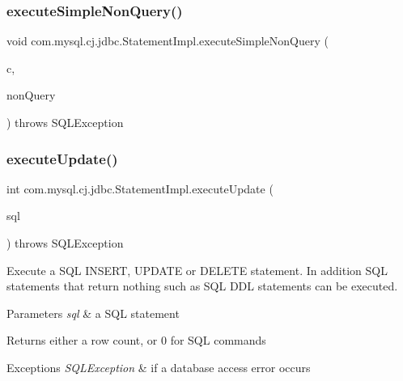\subsubsection{\texorpdfstring{execute\+Simple\+Non\+Query()}{executeSimpleNonQuery()}}
{\footnotesize\ttfamily void com.\+mysql.\+cj.\+jdbc.\+Statement\+Impl.\+execute\+Simple\+Non\+Query (\begin{DoxyParamCaption}\item[{\mbox{\hyperlink{interfacecom_1_1mysql_1_1cj_1_1jdbc_1_1_jdbc_connection}{Jdbc\+Connection}}}]{c,  }\item[{String}]{non\+Query }\end{DoxyParamCaption}) throws S\+Q\+L\+Exception}

\mbox{\label{classcom_1_1mysql_1_1cj_1_1jdbc_1_1_statement_impl_a8df7dbcd016833437419cfdbae14b187}} 
\subsubsection{\texorpdfstring{execute\+Update()}{executeUpdate()}\hspace{0.1cm}{\footnotesize\ttfamily [1/4]}}
{\footnotesize\ttfamily int com.\+mysql.\+cj.\+jdbc.\+Statement\+Impl.\+execute\+Update (\begin{DoxyParamCaption}\item[{String}]{sql }\end{DoxyParamCaption}) throws S\+Q\+L\+Exception}

Execute a S\+QL I\+N\+S\+E\+RT, U\+P\+D\+A\+TE or D\+E\+L\+E\+TE statement. In addition S\+QL statements that return nothing such as S\+QL D\+DL statements can be executed.


\begin{DoxyParams}{Parameters}
{\em sql} & a S\+QL statement\\
\hline
\end{DoxyParams}
\begin{DoxyReturn}{Returns}
either a row count, or 0 for S\+QL commands
\end{DoxyReturn}

\begin{DoxyExceptions}{Exceptions}
{\em S\+Q\+L\+Exception} & if a database access error occurs \\
\hline
\end{DoxyExceptions}
\mbox{\label{classcom_1_1mysql_1_1cj_1_1jdbc_1_1_statement_impl_a17446c85d153a1456965eb64858b5f46}} 
